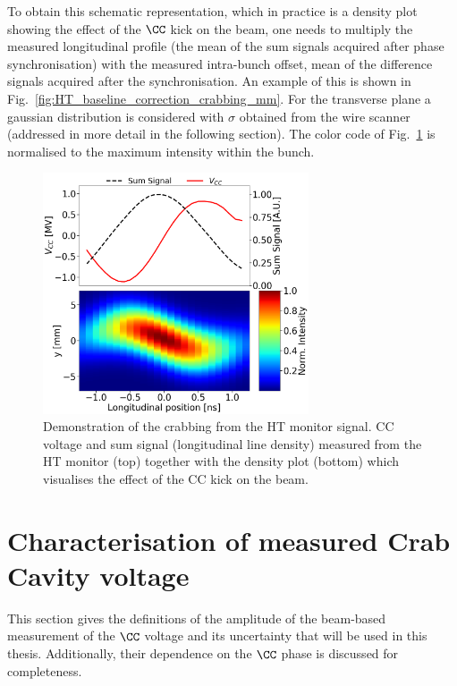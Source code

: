 To obtain this schematic representation, which in practice is a density plot showing the effect of the $\CC$ kick on the beam, one needs to multiply the measured longitudinal profile (the mean of the sum signals acquired after phase synchronisation) with the measured intra-bunch offset, mean of the difference signals acquired after the synchronisation. An example of this is shown in Fig.~\ref{fig:HT_baseline_correction_crabbing_mm}. For the transverse plane a gaussian distribution is considered with $\sigma$ obtained from the wire scanner (addressed in more detail in the following section). The color code of Fig.~\ref{fig:crabbing_reconstruction_HT_monitor} is normalised to the maximum intensity within the bunch.

\begin{figure}[!h]
   \centering         
   \includegraphics[width=0.7\textwidth]{images/Ch4/HT_crabVoltage__20180530_135105_crabbing_only_CC_post_processing.png}
       \caption{Demonstration of the crabbing from the HT monitor signal. CC voltage and sum signal (longitudinal line density) measured from the HT monitor (top) together with the density plot (bottom) which visualises the effect of the CC kick on the beam.}
       \label{fig:crabbing_reconstruction_HT_monitor}
\end{figure}
   

\section{Characterisation of measured Crab Cavity voltage}\label{sec:CC_voltage_meas}
This section gives the definitions of the amplitude of the beam-based measurement of the $\CC$ voltage and its uncertainty that will be used in this thesis. Additionally, their dependence on the $\CC$ phase is discussed for completeness.

